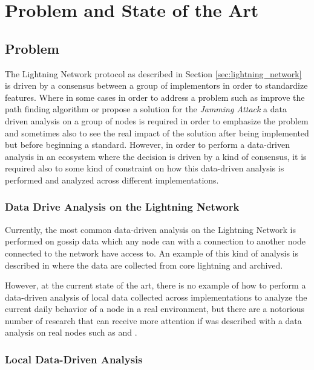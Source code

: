 \chapter{Problem and State of the Art}
\label{sec:problem_and_state_of_the_art}

\section{Problem}

The Lightning Network protocol as described in Section \ref{sec:lightning_network} is 
driven by a consensus between a group of implementors in order to standardize
features. Where in some cases in order to address a problem such as 
improve the path finding algorithm\cite{DBLP:journals/corr/abs-2103-08576} or 
propose a solution for the \emph{Jamming Attack}\cite{cryptoeprint:2022/1454} 
a data driven analysis on a group of nodes is required in order to emphasize the
problem and sometimes also to see the real impact of the solution after being 
implemented but before beginning a standard.
However, in order to perform a data-driven analysis in an ecosystem where the decision
is driven by a kind of consensus, it is required also to some kind of 
constraint on how this data-driven analysis is performed and analyzed across 
different implementations.

\subsection{Data Drive Analysis on the Lightning Network}

Currently, the most common data-driven analysis on the Lightning Network is performed 
on gossip data which any node can with a connection to another node connected 
to the network have access to. An example of this kind of analysis is described in \cite{lngossip}
where the data are collected from core lightning and archived.

However, at the current state of the art, there is no example of how to perform
a data-driven analysis of local data collected across implementations to 
analyze the current daily behavior of a node in a real environment, but there
are a notorious number of research that can receive more attention if was 
described with a data analysis on real nodes such as \cite{DBLP:journals/corr/abs-2103-08576} 
and \cite{cryptoeprint:2022/1454}.


\subsection{Local Data-Driven Analysis}

